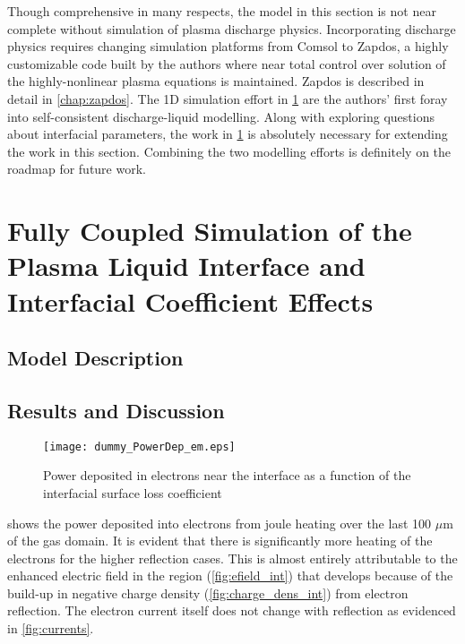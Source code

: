 Though comprehensive in many respects, the model in this section is not near complete without simulation of plasma discharge physics. Incorporating discharge physics requires changing simulation platforms from Comsol to Zapdos, a highly customizable code built by the authors where near total control over solution of the highly-nonlinear plasma equations is maintained. Zapdos is described in detail in \cref{chap:zapdos}. The 1D simulation effort in \cref{sec:plasliq} are the authors' first foray into self-consistent discharge-liquid modelling. Along with exploring questions about interfacial parameters, the work in \cref{sec:plasliq} is absolutely necessary for extending the work in this section. Combining the two modelling efforts is definitely on the roadmap for future work.

\FloatBarrier

\section{Fully Coupled Simulation of the Plasma Liquid Interface and Interfacial Coefficient Effects}
\label{sec:plasliq}

\subsection{Model Description}
\label{sec:model}

\FloatBarrier

\subsection{Results and Discussion}
\label{sec:plasliq_results}



\begin{figure}[htpb]
  \centering
  \texttt{[image: dummy\_PowerDep\_em.eps]}
  \caption{Power deposited in electrons near the interface as a function of the interfacial surface loss coefficient}
  \label{fig:powerDep_em_int}
\end{figure}

 shows the power deposited into electrons from joule heating over the last 100 $\mu$m of the gas domain. It is evident that there is significantly more heating of the electrons for the higher reflection cases. This is almost entirely attributable to the enhanced electric field in the region (\cref{fig:efield_int}) that develops because of the build-up in negative charge density (\cref{fig:charge_dens_int}) from electron reflection. The electron current itself does not change with reflection as evidenced in \cref{fig:currents}.

